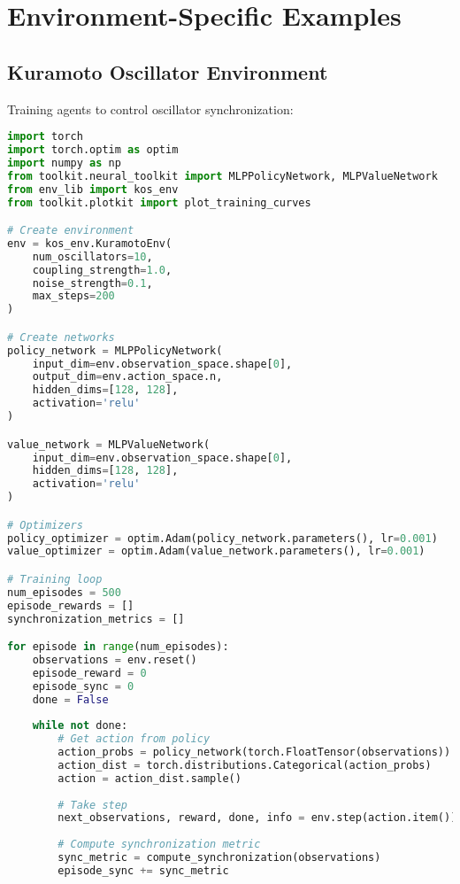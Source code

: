 \section{Environment-Specific Examples}

\subsection{Kuramoto Oscillator Environment}

Training agents to control oscillator synchronization:

\begin{lstlisting}[language=python, caption=Kuramoto Oscillator Training]
import torch
import torch.optim as optim
import numpy as np
from toolkit.neural_toolkit import MLPPolicyNetwork, MLPValueNetwork
from env_lib import kos_env
from toolkit.plotkit import plot_training_curves

# Create environment
env = kos_env.KuramotoEnv(
    num_oscillators=10,
    coupling_strength=1.0,
    noise_strength=0.1,
    max_steps=200
)

# Create networks
policy_network = MLPPolicyNetwork(
    input_dim=env.observation_space.shape[0],
    output_dim=env.action_space.n,
    hidden_dims=[128, 128],
    activation='relu'
)

value_network = MLPValueNetwork(
    input_dim=env.observation_space.shape[0],
    hidden_dims=[128, 128],
    activation='relu'
)

# Optimizers
policy_optimizer = optim.Adam(policy_network.parameters(), lr=0.001)
value_optimizer = optim.Adam(value_network.parameters(), lr=0.001)

# Training loop
num_episodes = 500
episode_rewards = []
synchronization_metrics = []

for episode in range(num_episodes):
    observations = env.reset()
    episode_reward = 0
    episode_sync = 0
    done = False
    
    while not done:
        # Get action from policy
        action_probs = policy_network(torch.FloatTensor(observations))
        action_dist = torch.distributions.Categorical(action_probs)
        action = action_dist.sample()
        
        # Take step
        next_observations, reward, done, info = env.step(action.item())
        
        # Compute synchronization metric
        sync_metric = compute_synchronization(observations)
        episode_sync += sync_metric
        

\end{lstlisting}
